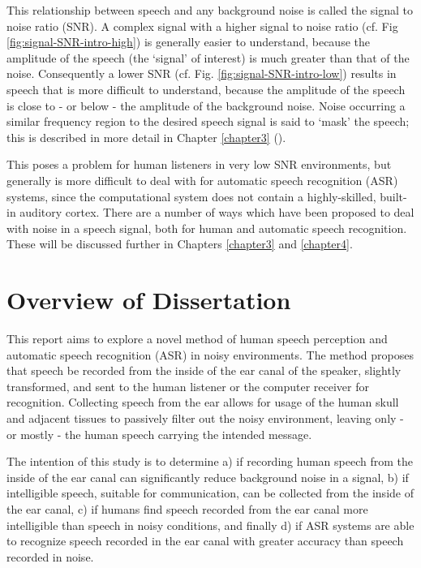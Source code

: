 This relationship between speech and any background noise is called the signal to noise ratio (SNR).  A complex signal with a higher signal to noise ratio (cf. Fig \ref{fig:signal-SNR-intro-high}) is generally easier to understand, because the amplitude of the speech (the `signal' of interest) is much greater than that of the noise.  Consequently a lower SNR (cf. Fig. \ref{fig:signal-SNR-intro-low}) results in speech that is more difficult to understand, because the amplitude of the speech is close to - or below - the amplitude of the background noise.  Noise occurring a similar frequency region to the desired speech signal is said to `mask' the speech; this is described in more detail in Chapter \ref{chapter3} (\cite{mattys:12}).

This poses a problem for human listeners in very low SNR environments, but generally is more difficult to deal with for automatic speech recognition (ASR) systems, since the computational system does not contain a highly-skilled, built-in auditory cortex.  There are a number of ways which have been proposed to deal with noise in a speech signal, both for human and automatic speech recognition.  These will be discussed further in Chapters \ref{chapter3} and \ref{chapter4}.

\section{Overview of Dissertation}\label{ch1:diss-overview}

This report aims to explore a novel method of human speech perception and automatic speech recognition (ASR) in noisy environments.  The method proposes that speech be recorded from the inside of the ear canal of the speaker, slightly transformed, and sent to the human listener or the computer receiver for recognition.  Collecting speech from the ear allows for usage of the human skull and adjacent tissues to passively filter out the noisy environment, leaving only - or mostly - the human speech carrying the intended message.  
	
The intention of this study is to determine a) if recording human speech from the inside of the ear canal can significantly reduce background noise in a signal, b) if intelligible speech, suitable for communication, can be collected from the inside of the ear canal, c) if humans find speech recorded from the ear canal more intelligible than speech in noisy conditions, and finally d) if ASR systems are able to recognize speech recorded in the ear canal with greater accuracy than speech recorded in noise.
	

